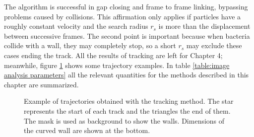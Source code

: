 The algorithm is successful in gap closing and frame to frame linking, bypassing problems caused by collisions. This affirmation only applies if particles have a roughly constant velocity and the search radius $r_s$ is more than the displacement between successive frames. The second point is important because when bacteria collide with a wall, they may completely stop, so a short $r_s$ may exclude these cases ending the track. All the results of tracking are left for Chapter 4; meanwhile, figure \ref{tracking_examples} shows some trajectory examples. In table \ref{table:image analysis parameters} all the relevant quantities for the methods described in this chapter are summarized.

\begin{figure}
	\centering
	
	\caption[Example of trajectories]{Example of trajectories obtained with the tracking method. The star represents the start of each track and the triangles the end of them. The mask is used as background to show the walls. Dimensions of the curved wall are shown at the bottom.}
	\label{tracking_examples}
\end{figure}



